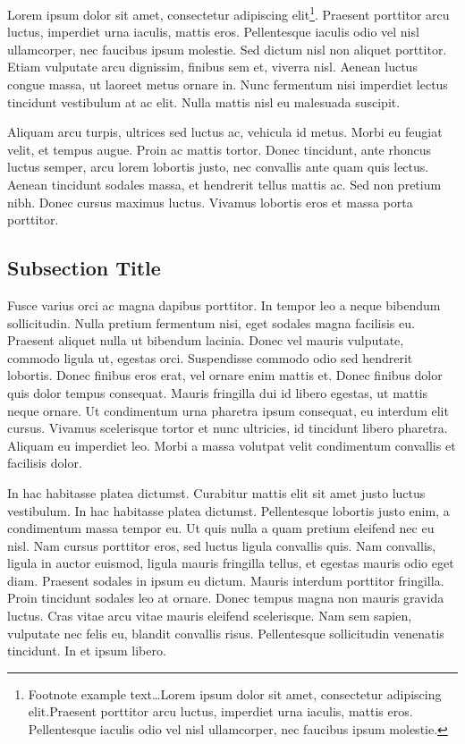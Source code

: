 \documentclass[
	11pt, %
	fleqn, %
	a4paper, %
]{LegrandOrangeBook}
\begin{document}
Lorem ipsum dolor sit amet, consectetur adipiscing elit\footnote{Footnote example text\ldots Lorem ipsum dolor sit amet, consectetur adipiscing elit.Praesent porttitor arcu luctus, imperdiet urna iaculis, mattis eros.
Pellentesque iaculis odio vel nisl ullamcorper, nec faucibus ipsum molestie.}.
Praesent porttitor arcu luctus, imperdiet urna iaculis, mattis eros.
Pellentesque iaculis odio vel nisl ullamcorper, nec faucibus ipsum molestie.
Sed dictum nisl non aliquet porttitor.
Etiam vulputate arcu dignissim, finibus sem et, viverra nisl.
Aenean luctus congue massa, ut laoreet metus ornare in.
Nunc fermentum nisi imperdiet lectus tincidunt vestibulum at ac elit.
Nulla mattis nisl eu malesuada suscipit.

Aliquam arcu turpis, ultrices sed luctus ac, vehicula id metus.
Morbi eu feugiat velit, et tempus augue.
Proin ac mattis tortor.
Donec tincidunt, ante rhoncus luctus semper, arcu lorem lobortis justo, nec convallis ante quam quis lectus.
Aenean tincidunt sodales massa, et hendrerit tellus mattis ac.
Sed non pretium nibh.
Donec cursus maximus luctus.
Vivamus lobortis eros et massa porta porttitor.



\subsection{Subsection Title}

Fusce varius orci ac magna dapibus porttitor.
In tempor leo a neque bibendum sollicitudin.
Nulla pretium fermentum nisi, eget sodales magna facilisis eu.
Praesent aliquet nulla ut bibendum lacinia.
Donec vel mauris vulputate, commodo ligula ut, egestas orci.
Suspendisse commodo odio sed hendrerit lobortis.
Donec finibus eros erat, vel ornare enim mattis et.
Donec finibus dolor quis dolor tempus consequat.
Mauris fringilla dui id libero egestas, ut mattis neque ornare.
Ut condimentum urna pharetra ipsum consequat, eu interdum elit cursus.
Vivamus scelerisque tortor et nunc ultricies, id tincidunt libero pharetra.
Aliquam eu imperdiet leo.
Morbi a massa volutpat velit condimentum convallis et facilisis dolor.

In hac habitasse platea dictumst.
Curabitur mattis elit sit amet justo luctus vestibulum.
In hac habitasse platea dictumst.
Pellentesque lobortis justo enim, a condimentum massa tempor eu.
Ut quis nulla a quam pretium eleifend nec eu nisl.
Nam cursus porttitor eros, sed luctus ligula convallis quis.
Nam convallis, ligula in auctor euismod, ligula mauris fringilla tellus, et egestas mauris odio eget diam.
Praesent sodales in ipsum eu dictum.
Mauris interdum porttitor fringilla.
Proin tincidunt sodales leo at ornare.
Donec tempus magna non mauris gravida luctus.
Cras vitae arcu vitae mauris eleifend scelerisque.
Nam sem sapien, vulputate nec felis eu, blandit convallis risus.
Pellentesque sollicitudin venenatis tincidunt.
In et ipsum libero.
\end{document}
